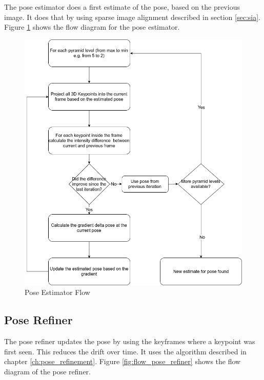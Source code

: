 \documentclass[11pt,a4paper,titlepage,oneside]{report}
\begin{document}
The pose estimator does a first estimate of the pose, based on the previous image. It does that by using sparse image alignment described in section \ref{sec:sia}. Figure \ref{fig:flow_pose_estimator} shows the flow diagram for the pose estimator.

\begin{figure}[H]
  \centering
  \includegraphics[scale=0.3]{img/flow_pose_estimator.png}
  \caption{Pose Estimator Flow}\label{fig:flow_pose_estimator}
\end{figure}

\subsection{Pose Refiner}

The pose refiner updates the pose by using the keyframes where a keypoint was first seen. This reduces the drift over time. It uses the algorithm described in chapter \ref{ch:pose_refinement}. Figure \ref{fig:flow_pose_refiner} shows the flow diagram of the pose refiner.
\end{document}
